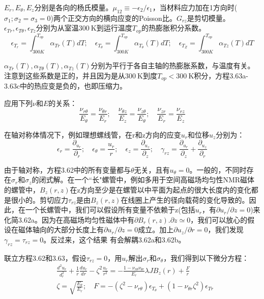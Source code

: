 $E_r, E_\theta, E_z$分别是各向的杨氏模量。$\mu_{12}\equiv -\epsilon_2/\epsilon_1$，当材料应力加在1方向时($\sigma_1;\sigma_2=\sigma_3=0$)两个正交方向的横向应变的Poisson比。$G_{rz}$是剪切模量。 
$\epsilon_{Tr},\epsilon_{T\theta},\epsilon_{Tz}$分别为从室温$300\ \mathrm{K}$到运行温度$T_{op}$的热膨胀积分系数。
\begin{equation*}
\epsilon_{T_r}=\int_{300K}^{T_{op}}\alpha_{Tr}(T)dT;\quad
\epsilon_{T_\theta}=\int_{300K}^{T_{op}}\alpha_{T_\theta}(T)dT;\quad
\epsilon_{T_Z}=\int_{300K}^{T_{op}}\alpha_{Tz}(T)dT \tag{3.63e}
\end{equation*}

$\alpha_{Tr}(T),\alpha_{T\theta}(T),\alpha_{Tz}(T)$分别为平行于各自主轴的热膨胀系数，与温度有关。
注意到这些系数是正的，并且因为是从$300\ \mathrm{K}$到度$T_{op}<300\ \mathrm{K}$积分，方程3.63a-3.63c中的热应变是负的，也即压缩力。

应用下列$\nu$和$E$的关系：
\begin{equation*}
\frac{\nu_{r\theta}}{E_\theta}=\frac{\nu_{\theta r}}{E_r};\quad \frac{\nu_{\theta z}}{E_z}=\frac{\nu_{z\theta}}{E_\theta};\quad \frac{\nu_{zr}}{E_r}=\frac{\nu_{rz}}{E_z} \tag{3.63f}
\end{equation*}

在轴对称体情况下，例如理想螺线管，在r和z方向的应变$u_r$和位移$u_z$分别为：
\begin{equation*}
\epsilon_r=\frac{\partial_{u_r}}{\partial_r};\quad \epsilon_\theta=\frac{u_r}{r};\quad \epsilon_z=\frac{\partial_{u_z}}{\partial_z};\quad \gamma_{rz}=\frac{\partial_{u_r}}{\partial_z}+\frac{\partial_{u_z}}{\partial_r} \tag{3.63g}
\end{equation*}

由于轴对称，方程3.62中的所有变量都与$\theta$无关，且有$u_\theta=0$。一般的，不同时存在$\sigma_r$和$\sigma_z$的闭式解。在一个``长"螺管中，例如多用于空间高磁场均匀性NMR磁体的螺管中，$B_z(r, z)$在z方向至少是在螺管以中平面为起点的很大长度内的变化都是很小的。剪切应力$\tau_{rz}$是由$B_z(r,z)$在线圈上产生的径向载荷的变化导致的。因此，在一个长螺管中，我们可以假设所有变量不依赖于z(包括$u_r$，有$\partial u_r/\partial z=0$)来化简3.62a。因为在高磁场均匀性磁体中有$\partial B_r(r,z).\partial z\simeq 0$，我们可以放心的假设在磁体轴向的大部分长度上有$\partial u_r/\partial z=0$成立。加上$\partial u_z/\partial r=0$，我们发现$\gamma_{rz}=\tau_{rz}=0$。反过来，这个结果 有会解耦3.62a和3.62b。

联立方程3.62和3.63，假设$\tau_{rz}=0$，用$u_r$解出$\sigma_r$和$\sigma_{\theta}$，我们得到以下微分方程：
\begin{subequations}
	\begin{align}
&\frac{d^2u_r}{d_r^2}+\frac{1}{r}\frac{du_r}{dr}-\zeta^2\frac{u_r}{r^2}=-\frac{1-\nu_{r\theta}\nu_{\theta r}}{E_r}\lambda JB_z(r)+\frac{F}{r}\\
&\zeta=\sqrt{\frac{E_\theta}{E_r}};\quad F=
-(\zeta^2-\nu_{r \theta})\epsilon_{T_\theta}+(1-\nu_{\theta r}\zeta^2)\epsilon_{Tr}
	\end{align}
\end{subequations}

